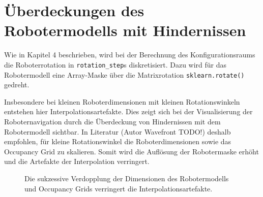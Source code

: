 \section{Überdeckungen des Robotermodells mit Hindernissen}

Wie in Kapitel 4 beschrieben, wird bei der Berechnung des Konfigurationsraums die Roboterrotation in \texttt{rotation\_step}s diskretisiert. Dazu wird für das Robotermodell eine Array-Maske über die Matrixrotation \texttt{sklearn.rotate()} gedreht. 

Insbesondere bei kleinen Roboterdimensionen mit kleinen Rotationswinkeln entstehen hier Interpolationsartefakte.
Dies zeigt sich bei der Visualisierung der Roboternavigation durch die Überdeckung von Hindernissen mit dem Robotermodell sichtbar. In Literatur (Autor Wavefront TODO!) deshalb empfohlen, für kleine Rotationswinkel die Roboterdimensionen sowie das Occupancy Grid zu skalieren.
Somit wird die Auflösung der Robotermaske erhöht und die Artefakte der Interpolation verringert.

\begin{figure}[h!]
	\footnotesize
	\centering
	\hspace*{-0.075\linewidth}
	\centerline{}
	\hspace*{-0.075\linewidth}
	\caption{Die sukzessive Verdopplung der Dimensionen des Robotermodells und Occupancy Grids verringert die Interpolationsartefakte.}
\end{figure}







